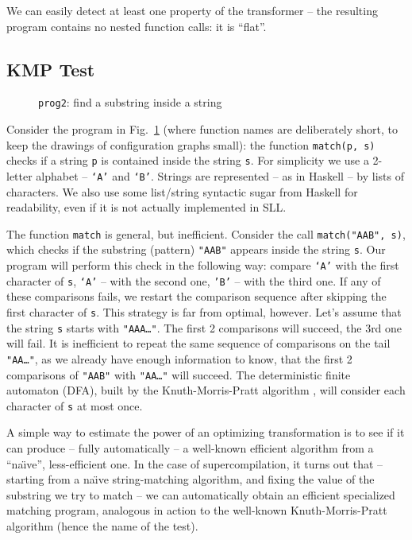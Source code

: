 We can easily detect at least one property of the transformer -- the resulting program
contains no nested function calls: it is ``flat''.

\subsection{KMP Test}

\begin{figure}[t!]
\caption{\texttt{prog2}: find a substring inside a string}
\label{fig:prog2}

\end{figure}

Consider the program in Fig.~\ref{fig:prog2}
(where function names are deliberately short, to keep the drawings of configuration
graphs small):
the function \texttt{match(p, s)} checks if a string \texttt{p}
is contained inside the string \texttt{s}.
For simplicity we use a 2-letter alphabet -- \texttt{`A'} and \texttt{`B'}.
Strings are represented -- as in Haskell -- by lists of characters.
We also use some list/string syntactic sugar from
Haskell for readability, even if it is not actually implemented in SLL.

The function \texttt{match} is general, but inefficient.
Consider the call \texttt{match("AAB", s)},
which checks if the substring (pattern) \texttt{"AAB"} appears inside the string \texttt{s}.
Our program will perform this check in the following way: compare \texttt{`A'}
with the first character of \texttt{s}, \texttt{`A'} -- with the second one,
\texttt{'B'} -- with the third one.
If any of these comparisons fails, we restart the comparison sequence
after skipping the first character of \texttt{s}.
This strategy is far from optimal, however.
Let's assume that the string \texttt{s} starts with \texttt{"AAA\ldots"}.
The first 2 comparisons will succeed, the 3rd one will fail.
It is inefficient to repeat the same sequence of comparisons
on the tail \texttt{"AA\ldots"},
as we already have enough information to know, that the first 2 comparisons of \texttt{"AAB"}
with \texttt{"AA\ldots"} will succeed.
The deterministic finite automaton (DFA), built by the Knuth-Morris-Pratt algorithm \cite{Knuth1977Fast},
will consider each character of \texttt{s} at most once.

A simple way to estimate the power of an optimizing transformation is to see if it
can produce -- fully automatically -- a well-known efficient algorithm
from a ``na\"{\i}ve'', less-efficient one.
In the case of supercompilation, it turns out that
-- starting from a na\"{\i}ve string-matching algorithm,
and fixing the value of the substring we try to match --
we can automatically obtain an efficient specialized matching program,
analogous in action to the well-known Knuth-Morris-Pratt algorithm
(hence the name of the test).


